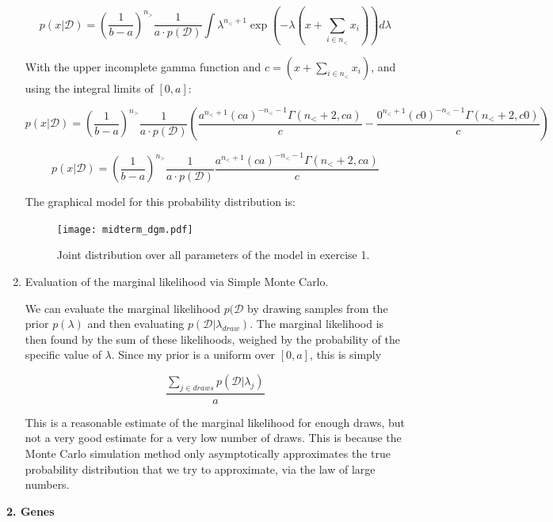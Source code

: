 \documentclass[11pt]{article}
\begin{document}
\begin{enumerate}[label=\textbf{\alph*.}]
        $$
        p(x|\mathcal{D}) = (\dfrac{1}{b - a})^{n_>} \dfrac{1}{a \cdot p(\mathcal{D})} \int \lambda^{n_< + 1} \exp (-\lambda (x + \sum_{i \in n_<} x_i)) d \lambda
        $$

        With the upper incomplete gamma function and $c = (x + \sum_{i \in n_<} x_i)$, and using the integral limits of $[0, a]$:

        $$
        p(x|\mathcal{D}) = (\dfrac{1}{b - a})^{n_>} \dfrac{1}{a \cdot p(\mathcal{D})} (\dfrac{a^{n_< + 1} (c a)^{- n_< - 1} \Gamma(n_< + 2, c a)}{c} - \dfrac{0^{n_< + 1} (c 0)^{- n_< - 1} \Gamma(n_< + 2, c 0)}{c})
        $$

        $$
        p(x|\mathcal{D}) = (\dfrac{1}{b - a})^{n_>} \dfrac{1}{a \cdot p(\mathcal{D})} \dfrac{a^{n_< + 1} (c a)^{- n_< - 1} \Gamma(n_< + 2, c a)}{c}
        $$

        The graphical model for this probability distribution is:

        \begin{figure}[H]
            \centering
            \texttt{[image: midterm\_dgm.pdf]}
            \caption{Joint distribution over all parameters of the model in exercise 1.}
        \end{figure}

    \item Evaluation of the marginal likelihood via Simple Monte Carlo.

        We can evaluate the marginal likelihood $p(\mathcal{D}$ by drawing samples from the prior $p(\lambda)$ and then evaluating $p(\mathcal{D}|\lambda_{draw})$. The marginal likelihood is then found by the sum of these likelihoods, weighed by the probability of the specific value of $\lambda$. Since my prior is a uniform over $[0, a]$, this is simply

        $$
        \dfrac{\sum_{j \in draws} p(\mathcal{D}|\lambda_{j})}{a}
        $$

        This is a reasonable estimate of the marginal likelihood for enough draws, but not a very good estimate for a very low number of draws. This is because the Monte Carlo simulation method only asymptotically approximates the true probability distribution that we try to approximate, via the law of large numbers.

\end{enumerate}

\textbf{2. Genes}
\end{document}
